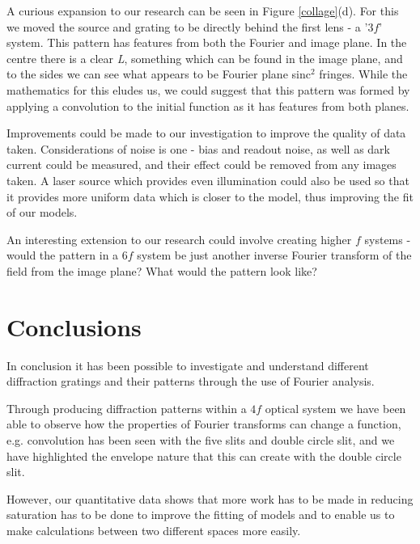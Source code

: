 \documentclass[twocolumn]{revtex4}
\begin{document}
A curious expansion to our research can be seen in Figure \ref{collage}(d). For this we moved the source and grating to be directly behind the first lens - a '$3f$' system. This pattern has features from both the Fourier and image plane. In the centre there is a clear \textit{L}, something which can be found in the image plane, and to the sides we can see what appears to be Fourier plane sinc$^2$ fringes. While the mathematics for this eludes us, we could suggest that this pattern was formed by applying a convolution to the initial function as it has features from both planes.

Improvements could be made to our investigation to improve the quality of data taken. Considerations of noise is one - bias and readout noise, as well as dark current could be measured, and their effect could be removed from any images taken. A laser source which provides even illumination could also be used so that it provides more uniform data which is closer to the model, thus improving the fit of our models.

An interesting extension to our research could involve creating higher $f$ systems - would the pattern in a $6f$ system be just another inverse Fourier transform of the field from the image plane? What would the pattern look like?

\vspace{-5ex}
\section{Conclusions}
\vspace{-2ex}

In conclusion it has been possible to investigate and understand different diffraction gratings and their patterns through the use of Fourier analysis.

Through producing diffraction patterns within a $4f$ optical system we have been able to observe how the properties of Fourier transforms can change a function, e.g. convolution has been seen with the five slits and double circle slit, and we have highlighted the envelope nature that this can create with the double circle slit.

However, our quantitative data shows that more work has to be made in reducing saturation has to be done to improve the fitting of models and to enable us to make calculations between two different spaces more easily.
\end{document}
